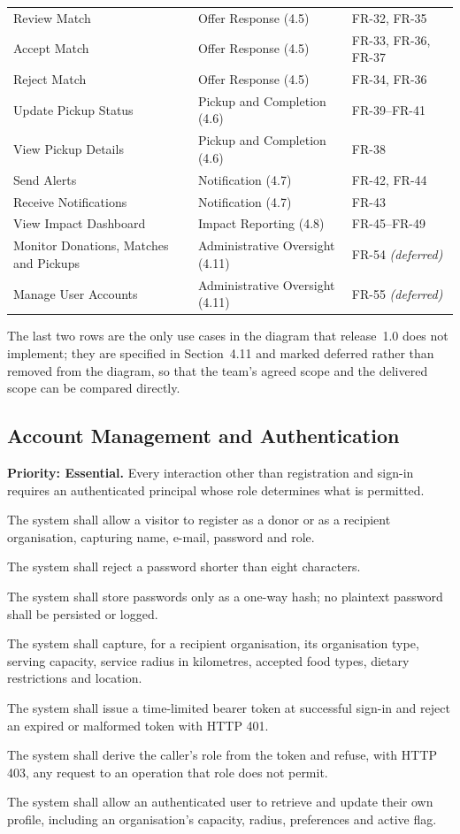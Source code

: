 \documentclass[11pt,a4paper]{article}
\newcommand{\req}[2]{\item[\textbf{#1}] #2}
\begin{document}
\begin{longtable}{@{}L{6.0cm}L{4.5cm}L{4.4cm}@{}}
Review Match                 & Offer Response (4.5) & FR-32, FR-35 \\
Accept Match                 & Offer Response (4.5) & FR-33, FR-36, FR-37 \\
Reject Match                 & Offer Response (4.5) & FR-34, FR-36 \\
Update Pickup Status         & Pickup and Completion (4.6) & FR-39--FR-41 \\
View Pickup Details          & Pickup and Completion (4.6) & FR-38 \\
Send Alerts                  & Notification (4.7) & FR-42, FR-44 \\
Receive Notifications        & Notification (4.7) & FR-43 \\
View Impact Dashboard        & Impact Reporting (4.8) & FR-45--FR-49 \\
Monitor Donations, Matches and Pickups & Administrative Oversight (4.11) & FR-54 \textit{(deferred)} \\
Manage User Accounts         & Administrative Oversight (4.11) & FR-55 \textit{(deferred)} \\
\end{longtable}
\endgroup

\noindent
The last two rows are the only use cases in the diagram that release~1.0 does
not implement; they are specified in Section~4.11 and marked deferred rather
than removed from the diagram, so that the team's agreed scope and the
delivered scope can be compared directly.

\subsection{Account Management and Authentication}
\textbf{Priority: Essential.} Every interaction other than registration and
sign-in requires an authenticated principal whose role determines what is
permitted.

\begin{description}[leftmargin=1.6cm,style=nextline,font=\normalfont\bfseries]
  \req{FR-1}{The system shall allow a visitor to register as a donor or as a
    recipient organisation, capturing name, e-mail, password and role.}
  \req{FR-2}{The system shall reject a password shorter than eight characters.}
  \req{FR-3}{The system shall store passwords only as a one-way hash; no
    plaintext password shall be persisted or logged.}
  \req{FR-4}{The system shall capture, for a recipient organisation, its
    organisation type, serving capacity, service radius in kilometres, accepted
    food types, dietary restrictions and location.}
  \req{FR-5}{The system shall issue a time-limited bearer token at successful
    sign-in and reject an expired or malformed token with HTTP 401.}
  \req{FR-6}{The system shall derive the caller's role from the token and refuse,
    with HTTP 403, any request to an operation that role does not permit.}
  \req{FR-7}{The system shall allow an authenticated user to retrieve and update
    their own profile, including an organisation's capacity, radius, preferences
    and active flag.}
\end{description}
\end{document}
